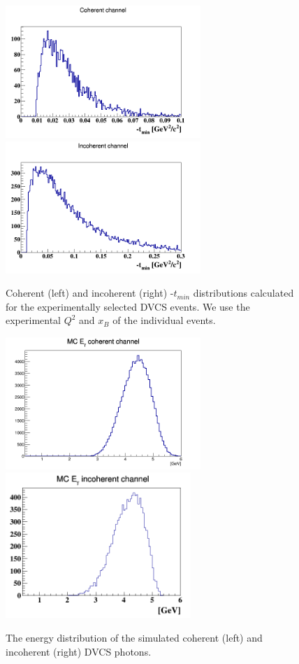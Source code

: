 \begin{itemize}
\begin{figure}[tbp]
\includegraphics[height=5.0cm]{fig_rtpc/updates/tmin_coh.png}
\includegraphics[height=5.0cm]{fig_rtpc/updates/tmin_incoh.png}
\caption{Coherent (left) and incoherent (right) -$t_{min}$ distributions 
calculated for the experimentally selected DVCS events. We use the experimental 
$Q^{2}$ and $x_{B}$ of the individual events. }
\label{fig:tmin_both}
 \end{figure}

\begin{figure}[tbp]
      \includegraphics[height=5.0cm]{fig_dvcs/photon_energy_coh_sim.png}
      \includegraphics[height=5.5cm]{fig_dvcs/photon_energy_incoh_sim.png}
      \caption{The energy distribution of the simulated coherent (left) and 
      incoherent (right) DVCS photons.}
      \label{fig:energy_dvcs_photons}
\end{figure}
\end{itemize}

